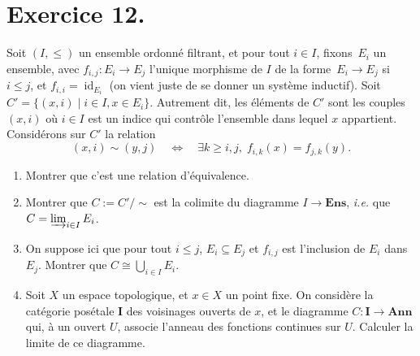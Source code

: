 \documentclass{../../td}
\newcommand\id{\ensuremath{\operatorname{id}}}
\begin{document}
  \chapter{Exercice 12.}
  \begin{slshape}
    \color{deepblue}

    Soit $(I, \le)$ un ensemble ordonné filtrant, et pour tout $i \in I$, fixons~$E_i$ un ensemble, avec $f_{i,j} : E_i \to E_j$ l'unique morphisme de $I$ de la forme~$E_i \to E_j$ si~$i \le j$, et $f_{i,i} = \id_{E_i}$ (on vient juste de se donner un système inductif). Soit~$C' = \{(x,i)  \mid i \in I, x \in E_i\}$.
    Autrement dit, les éléments de $C'$ sont les couples $(x,i)$ où  $i \in I$ est un indice qui contrôle l'ensemble dans lequel $x$ appartient.
    Considérons sur $C'$ la relation \[
      (x, i) \sim (y, j) \quad \iff \quad\exists k \ge i,j,\; f_{i,k}(x) = f_{j,k}(y)
    .\]
    \begin{enumerate}
      \item Montrer que c'est une relation d'équivalence.
      \item Montrer que  $C := C' / \sim$ est la colimite du diagramme $I \to \mathbf{Ens}$, \textit{i.e.} que $C = \varinjlim_{i \in I} E_i$. \label{ex12-q2}
      \item On suppose ici que pour tout $i \le j$, $E_i \subseteq E_j$ et $f_{i,j}$ est l'inclusion de $E_i$ dans $E_j$. Montrer que $C \cong \bigcup_{i \in  I} E_i$.
      \item Soit $X$ un espace topologique, et $x \in X$ un point fixe.
        On considère la catégorie posétale $\mathbf{I}$ des voisinages ouverts de $x$, et le diagramme $C : \mathbf{I} \to \mathbf{Ann}$ qui, à un ouvert $U$, associe l'anneau des fonctions continues sur $U$. Calculer la limite de ce diagramme.
    \end{enumerate}
  \end{slshape}
\end{document}

